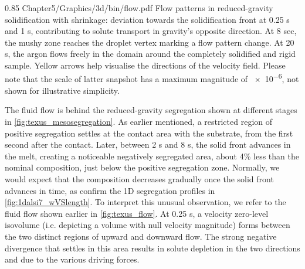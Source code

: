 \begin{figureth}
{0.85}
{Chapter5/Graphics/3d/bin/flow.pdf}
{Flow patterns in reduced-gravity solidification with shrinkage: 
deviation towards the solidification front at 0.25 s and 1 s, contributing to solute transport in gravity's opposite direction.
At 8 sec, the mushy zone reaches the droplet vertex marking a flow pattern change. 
At 20 s, the argon flows freely in the domain around the completely solidified and rigid sample.
Yellow arrows help visualise the directions of the velocity field. 
Please note that the scale of latter snapshot has a maximum magnitude of \SI{e-6}{\uvelocity}, not shown
for illustrative simplicity.}
\label{fig:texus_flow}
\end{figureth}

The fluid flow is behind the reduced-gravity segregation shown at different stages in \cref{fig:texus_mesosegregation}.
As earlier mentioned, a restricted region of positive segregation settles at the contact area with the substrate,
from the first second after the contact. Later, between 2 s and 8 s, the solid front advances in the melt, creating 
a noticeable negatively segregated area, about 4\% less than the nominal composition, just below the positive segregation zone.
Normally, we would expect that the composition decreases gradually once the solid front advances in time, as confirm the 1D segregation
profiles in \cref{fig:1dalsi7_wVSlength}. To interpret this unusual observation, we refer to the fluid flow shown earlier in \cref{fig:texus_flow}.
At 0.25 s, a velocity zero-level isovolume (i.e. depicting a volume with null velocity magnitude) forms between the two distinct regions
of upward and downward flow. The strong negative divergence that settles in this area results in solute depletion in the two directions
and due to the various driving forces. 


